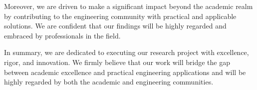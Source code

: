\documentclass[12pt, a4paper]{article}
\begin{document}
Moreover, we are driven to make a significant impact beyond the academic realm by contributing to the engineering community with practical and applicable solutions. We are confident that our findings will be highly regarded and embraced by professionals in the field.

In summary, we are dedicated to executing our research project with excellence, rigor, and innovation. We firmly believe that our work will bridge the gap between academic excellence and practical engineering applications and will be highly regarded by both the academic and engineering communities.


\newpage
% 
\printbibliography
% 
\end{document}
